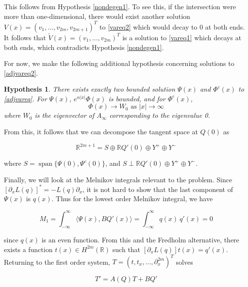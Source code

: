 \documentclass[12pt]{article}
\def\R{{\mathbb R}}
\DeclareMathOperator{\spn}{span}
\newtheorem{hypothesis}{Hypothesis}
\begin{document}
This follows from Hypothesis \ref{nondegen1}. To see this, if the intersection were more than one-dimensional, there would exist another solution $V(x) = (v_1, \dots, v_{2m}, v_{2m+1})^T$ to \eqref{vareq2} which would decay to 0 at both ends. It follows that $\tilde{V}(x) = (v_1, \dots, v_{2m})^T$ is a solution to \eqref{vareq1} which decays at both ends, which contradicts Hypothesis \ref{nondegen1}.

For now, we make the following additional hypothesis concerning solutions to \eqref{adjvareq2}.

\begin{hypothesis}\label{adjsolutions}
There exists exactly two bounded solution $\Psi(x)$ and $\Phi^c(x)$ to \eqref{adjvareq}. For $\Psi(x)$, $e^{\alpha |x|}\Phi(x)$ is bounded, and for $\Phi^c(x)$,
\begin{equation}
\Phi(x) \rightarrow W_0 \text{ as }|x| \rightarrow \infty
\end{equation}
where $W_0$ is the eigenvector of $A_\infty$ corresponding to the eigenvalue 0.
\end{hypothesis}

From this, it follows that we can decompose the tangent space at $Q(0)$ as 

\begin{equation}
\R^{2m+1} = S \oplus \R Q'(0) \oplus Y^+ \oplus Y^-
\end{equation}

where $S = \spn\{ \Psi(0), \Psi^c(0) \}$, and $S \perp \R Q'(0) \oplus Y^+ \oplus Y^-$.

Finally, we will look at the Melnikov integrals relevant to the problem. Since $[ \partial_x L(q) ]^* = -L(q) \partial_x$, it is not hard to show that the last component of $\Psi(x)$ is $q(x)$. Thus for the lowest order Melnikov integral, we have

\begin{equation}
M_1 = \int_{-\infty}^\infty \langle \Psi(x), B Q'(x) \rangle =
\int_{-\infty}^\infty q(x) \: q'(x) = 0
\end{equation}

since $q(x)$ is an even function. From this and the Fredholm alternative, there exists a function $t(x) \in H^{2m}(\R)$ such that $[ \partial_x L(q) ]t(x) = q'(x)$. Returning to the first order system, $T = (t, t_x, \dots, \partial_x^{2m})^T$ solves 

\begin{equation}\label{eqforT}
T' = A(Q)T + BQ'
\end{equation}
\end{document}
